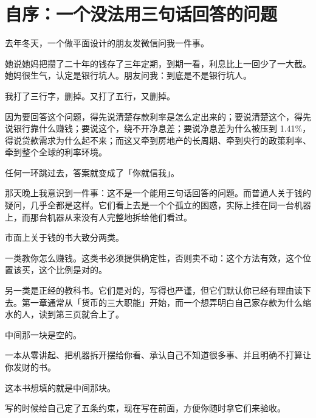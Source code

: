 \chapter*{自序：一个没法用三句话回答的问题}

去年冬天，一个做平面设计的朋友发微信问我一件事。

她说她妈把攒了二十年的钱存了三年定期，到期一看，利息比上一回少了一大截。她妈很生气，认定是银行坑人。朋友问我：到底是不是银行坑人。

我打了三行字，删掉。又打了五行，又删掉。

因为要回答这个问题，得先说清楚存款利率是怎么定出来的；要说清楚这个，得先说银行靠什么赚钱；要说这个，绕不开净息差；要说净息差为什么被压到 1.41\%，得说贷款需求为什么起不来；而这又牵到房地产的长周期、牵到央行的政策利率、牵到整个全球的利率环境。

任何一环跳过去，答案就变成了「你就信我」。

那天晚上我意识到一件事：这不是一个能用三句话回答的问题。而普通人关于钱的疑问，几乎全都是这样。它们看上去是一个个孤立的困惑，实际上挂在同一台机器上，而那台机器从来没有人完整地拆给他们看过。

\bookbreak

市面上关于钱的书大致分两类。

一类教你怎么赚钱。这类书必须提供确定性，否则卖不动：这个方法有效，这个位置该买，这个比例是对的。

另一类是正经的教科书。它们是对的，写得也严谨，但它们默认你已经有理由读下去。第一章通常从「货币的三大职能」开始，而一个想弄明白自己家存款为什么缩水的人，读到第三页就合上了。

中间那一块是空的。

一本从零讲起、把机器拆开摆给你看、承认自己不知道很多事、并且明确不打算让你发财的书。

这本书想填的就是中间那块。

\bookbreak

写的时候给自己定了五条约束，现在写在前面，方便你随时拿它们来验收。

\begin{flowlist}
\end{flowlist}


